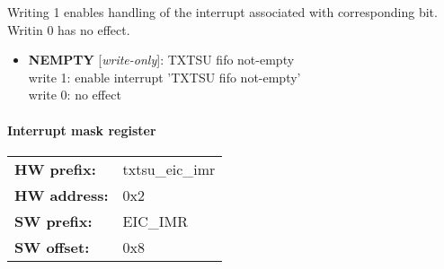\vspace{12pt}
Writing 1 enables handling of the interrupt associated with corresponding bit. Writin 0 has no effect.

\vspace{12pt}
\noindent
{}

\begin{itemize}
\item \begin{small}
{\bf 
NEMPTY
} [\emph{write-only}]: TXTSU fifo not-empty
\\
write 1: enable interrupt 'TXTSU fifo not-empty'\\write 0: no effect
\end{small}
\end{itemize}
\paragraph*{Interrupt mask register}\vspace{12pt}

\begin{tabular}{l l }
{\bf HW prefix:}  & txtsu\_eic\_imr\\
{\bf HW address:}  & 0x2\\
{\bf SW prefix:}  & EIC\_IMR\\
{\bf SW offset:}  & 0x8\\
\end{tabular}

